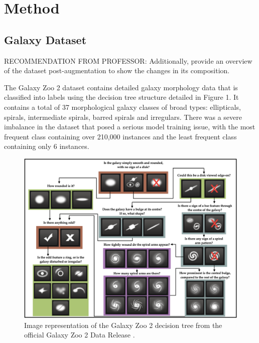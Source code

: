 \documentclass[10pt,twocolumn,letterpaper]{article}
\begin{document}
\section{Method}
\subsection{Galaxy Dataset}
RECOMMENDATION FROM PROFESSOR:
Additionally, provide an overview of the dataset post-augmentation to show the changes in its composition.

The Galaxy Zoo 2 dataset contains detailed galaxy morphology data that is classified into labels using the decision tree structure detailed in Figure 1.
It contains a total of 37 morphological galaxy classes of broad types: ellipticals, spirals, intermediate spirals, barred spirals and irregulars.
There was a severe imbalance in the dataset that posed a serious model training issue, with the most frequent class containing over 210,000 instances and the least frequent class containing only 6 instances.
\begin{figure}[htbp]
    \includegraphics[width=\linewidth]{decision_tree.png}
    \caption{Image representation of the Galaxy Zoo 2 decision tree from the official Galaxy Zoo 2 Data Release \cite{Willett13}.}
    \label{fig:decisiontree}
  \end{figure}
\end{document}
